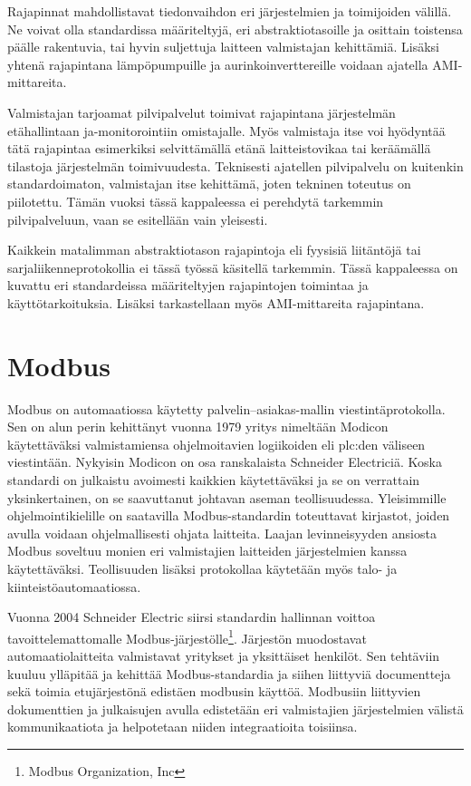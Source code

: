 Rajapinnat mahdollistavat tiedonvaihdon eri järjestelmien ja toimijoiden välillä. Ne voivat olla standardissa määriteltyjä, eri abstraktiotasoille ja osittain toistensa päälle rakentuvia, tai hyvin suljettuja laitteen valmistajan kehittämiä. Lisäksi yhtenä rajapintana lämpöpumpuille ja aurinkoinverttereille voidaan ajatella AMI-mittareita.

Valmistajan tarjoamat pilvipalvelut toimivat rajapintana järjestelmän etähallintaan ja\linebreak -monitorointiin omistajalle. Myös valmistaja itse voi hyödyntää tätä rajapintaa esimerkiksi selvittämällä etänä laitteistovikaa tai keräämällä tilastoja järjestelmän toimivuudesta. Teknisesti ajatellen pilvipalvelu on kuitenkin standardoimaton, valmistajan itse kehittämä, joten tekninen toteutus on piilotettu. Tämän vuoksi tässä kappaleessa ei perehdytä tarkemmin pilvipalveluun, vaan se esitellään vain yleisesti.

Kaikkein matalimman abstraktiotason rajapintoja eli fyysisiä liitäntöjä tai sarjaliikenneprotokollia ei tässä työssä käsitellä tarkemmin. Tässä kappaleessa on kuvattu eri standardeissa määriteltyjen rajapintojen toimintaa ja käyttötarkoituksia. Lisäksi tarkastellaan myös \gls{AMI}-mittareita rajapintana.

\section{Modbus}

  Modbus on automaatiossa käytetty palvelin--asiakas-mallin viestintäprotokolla. Sen on alun perin kehittänyt vuonna 1979 yritys nimeltään Modicon käytettäväksi valmistamiensa ohjelmoitavien logiikoiden eli \Gls{plc}:den väliseen viestintään. Nykyisin Modicon on osa ranskalaista Schneider Electriciä. Koska standardi on julkaistu avoimesti kaikkien käytettäväksi ja se on verrattain yksinkertainen, on se saavuttanut johtavan aseman teollisuudessa. Yleisimmille ohjelmointikielille on saatavilla Modbus-standardin toteuttavat kirjastot, joiden avulla voidaan ohjelmallisesti ohjata laitteita. Laajan levinneisyyden ansiosta Modbus soveltuu monien eri valmistajien laitteiden järjestelmien kanssa käytettäväksi. Teollisuuden lisäksi protokollaa käytetään myös talo- ja kiinteistöautomaatiossa. \mbox{\parencite{sousaPortugal, modbusAppSpec, modbusOrg}}

  Vuonna 2004 Schneider Electric siirsi standardin hallinnan voittoa tavoittelemattomalle Modbus-järjestölle\footnote{Modbus Organization, Inc}. Järjestön muodostavat automaatiolaitteita valmistavat yritykset ja yksittäiset henkilöt. Sen tehtäviin kuuluu ylläpitää ja kehittää Modbus-standardia ja siihen liittyviä documentteja sekä toimia etujärjestönä edistäen modbusin käyttöä. Modbusiin liittyvien dokumenttien ja julkaisujen avulla edistetään eri valmistajien järjestelmien välistä kommunikaatiota ja helpotetaan niiden integraatioita toisiinsa. \parencite{modbusOrg}

